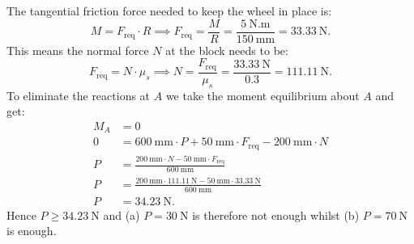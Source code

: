 \begin{derivation}
  The tangential friction force needed to keep the wheel in place is:
  \begin{equation*}
    M = F_{\mathrm{req}} \cdot R \implies F_{\mathrm{req}} = \frac{M}{R} = \frac{\qty{5}{\N.\m} }{\qty{150}{\mm}} = \qty{33,33}{\N}
  .\end{equation*}
  This means the normal force $N$ at the block needs to be:
  \begin{equation*}
    F_{\mathrm{req}} = N \cdot \mu_s \implies N = \frac{F_{\mathrm{req}}}{\mu_s} = \frac{\qty{33.33}{\N} }{\num{0.3} } = \qty{111,11}{\N}
  .\end{equation*}
  To eliminate the reactions at $A$ we take the moment equilibrium about $A$ and get:
  \begin{align*}
    M_A &= 0 \\
    0 &= \qty{600}{\mm} \cdot P + \qty{50}{\mm} \cdot F_{\mathrm{req}} - \qty{200}{\mm} \cdot N \\
    P &= \frac{\qty{200}{\mm} \cdot N - \qty{50}{\mm} \cdot F_{\mathrm{req}}}{\qty{600}{\mm} } \\
    P &= \frac{\qty{200}{\mm} \cdot \qty{111.11}{\N} - \qty{50}{\mm} \cdot \qty{33.33}{\N} }{\qty{600}{\mm} }  \\
    P &= \qty{34,23}{\N}
  .\end{align*}
  Hence $P \geq \qty{34,23}{\N}$ and (a) $P = \qty{30}{\N}$ is therefore not enough whilst (b) $P = \qty{70}{\N}$ is enough.
\end{derivation}

